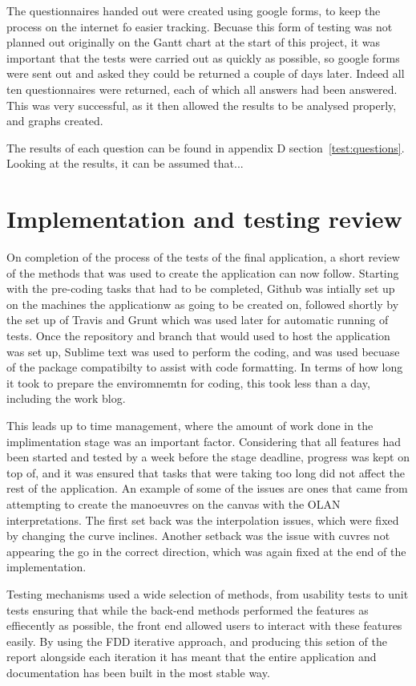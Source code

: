 The questionnaires handed out were created using google forms, to keep the process on the internet fo easier tracking. Becuase this form of testing was not planned out originally on the Gantt chart at the start of this project, it was important that the tests were carried out as quickly as possible, so google forms were sent out and asked they could be returned a couple of days later. Indeed all ten questionnaires were returned, each of which all answers had been answered. This was very successful, as it then allowed the results to be analysed properly, and graphs created.

The results of each question can be found in appendix D section~\ref{test:questions}. Looking at the results, it can be assumed that... %

\section{Implementation and testing review}
On completion of the process of the tests of the final application, a short review of the methods that was used to create the application can now follow. Starting with the pre-coding tasks that had to be completed, Github was intially set up on the machines the applicationw as going to be created on, followed shortly by the set up of Travis and Grunt which was used later for automatic running of tests. Once the repository and branch that would used to host the application was set up, Sublime text was used to perform the coding, and was used becuase of the package compatibilty to assist with code formatting. In terms of how long it took to prepare the enviromnemtn for coding, this took less than a day, including the work blog.

This leads up to time management, where the amount of work done in the implimentation stage was an important factor. Considering that all features had been started and tested by a week before the stage deadline, progress was kept on top of, and it was ensured that tasks that were taking too long did not affect the rest of the application. An example of some of the issues are ones that came from attempting to create the manoeuvres on the canvas with the OLAN interpretations. The first set back was the interpolation issues, which were fixed by changing the curve inclines. Another setback was the issue with cuvres not appearing the go in the correct direction, which was again fixed at the end of the implementation. 

Testing mechanisms used a wide selection of methods, from usability tests to unit tests ensuring that while the back-end methods performed the features as effiecently as possible, the front end allowed users to interact with these features easily. By using the FDD iterative approach, and producing this setion of the report alongside each iteration it has meant that the entire application and documentation has been built in the most stable way.

